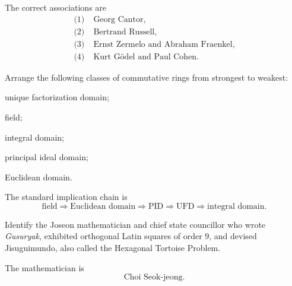     \begin{solution}
        The correct associations are
        \[
            \boxed{
                \begin{aligned}
                    \text{(1)}\;&\text{Georg Cantor},\\
                    \text{(2)}\;&\text{Bertrand Russell},\\
                    \text{(3)}\;&\text{Ernst Zermelo and Abraham Fraenkel},\\
                    \text{(4)}\;&\text{Kurt G\"odel and Paul Cohen}.
                \end{aligned}
            }
        \]
    \end{solution}

    \begin{expectedproblem}
        Arrange the following classes of commutative rings from strongest to
        weakest:
        \begin{problemchoices}
            \item unique factorization domain;
            \item field;
            \item integral domain;
            \item principal ideal domain;
            \item Euclidean domain.
        \end{problemchoices}
    \end{expectedproblem}

    \begin{solution}
        The standard implication chain is
        \[
            \boxed{
                \text{field}
                \Longrightarrow
                \text{Euclidean domain}
                \Longrightarrow
                \text{PID}
                \Longrightarrow
                \text{UFD}
                \Longrightarrow
                \text{integral domain}
            }.
        \]
    \end{solution}

    \begin{expectedproblem}
        Identify the Joseon mathematician and chief state councillor who wrote
        \textit{Gusuryak}, exhibited orthogonal Latin squares of order $9$, and
        devised Jisuguimundo, also called the Hexagonal Tortoise Problem.
    \end{expectedproblem}

    \begin{solution}
        The mathematician is
        \[
            \boxed{\text{Choi Seok-jeong}}.
        \]
    \end{solution}

